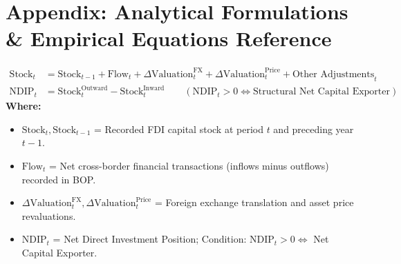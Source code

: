
\clearpage
\section*{Appendix: Analytical Formulations \& Empirical Equations Reference}

\begin{formulabox}
\footnotesize
\begin{align}
    \text{Stock}_t &= \text{Stock}_{t-1} + \text{Flow}_t + \Delta \text{Valuation}_t^{\text{FX}} + \Delta \text{Valuation}_t^{\text{Price}} + \text{Other Adjustments}_t \\
    \text{NDIP}_t &= \text{Stock}_t^{\text{Outward}} - \text{Stock}_t^{\text{Inward}} \qquad (\text{NDIP}_t > 0 \iff \text{Structural Net Capital Exporter})
\end{align}
\textbf{Where:}
\begin{itemize}[leftmargin=1.2em, itemsep=1pt]
    \item $\text{Stock}_t, \text{Stock}_{t-1}$ = Recorded FDI capital stock at period $t$ and preceding year $t-1$.
    \item $\text{Flow}_t$ = Net cross-border financial transactions (inflows minus outflows) recorded in BOP.
    \item $\Delta \text{Valuation}_t^{\text{FX}}, \Delta \text{Valuation}_t^{\text{Price}}$ = Foreign exchange translation and asset price revaluations.
    \item $\text{NDIP}_t$ = Net Direct Investment Position; Condition: $\text{NDIP}_t > 0 \iff$ Net Capital Exporter.
\end{itemize}
\end{formulabox}

